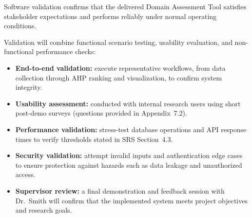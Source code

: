 \documentclass[12pt, titlepage]{article}
\begin{document}




Software validation confirms that the delivered Domain Assessment Tool satisfies
stakeholder expectations and performs reliably under normal operating
conditions.

Validation will combine functional scenario testing, usability evaluation, and
non-functional performance checks:

\begin{itemize}
  \item \textbf{End-to-end validation:} execute representative workflows, from
  data collection through AHP ranking and visualization, to confirm system
  integrity.

  \item \textbf{Usability assessment:} conducted with internal research users
  using short post-demo surveys (questions provided in Appendix~7.2).

  \item \textbf{Performance validation:} stress-test database operations and API
  response times to verify thresholds stated in SRS Section~4.3.

  \item \textbf{Security validation:} attempt invalid inputs and authentication
  edge cases to ensure protection against hazards such as data leakage and
  unauthorized access.

  \item \textbf{Supervisor review:} a final demonstration and feedback session
  with Dr.~Smith will confirm that the implemented system meets project
  objectives and research goals.
\end{itemize}
\end{document}
